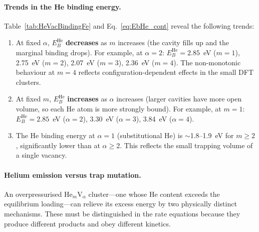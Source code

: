 \documentclass[pdflatex,sn-basic]{sn-jnl} %
\begin{document}
\paragraph{Trends in the He binding energy.}
Table~\ref{tab:HeVacBindingFe} and
Eq.~\eqref{eq:EbHe_cont} reveal the following trends:
\begin{enumerate}
    \item At fixed $\alpha$, $E_B^{\mathrm{He}}$ \textbf{decreases} as $m$
    increases (the cavity fills up and the marginal binding drops). For
    example, at $\alpha = 2$: $E_B^{\mathrm{He}} = 2.85$~eV ($m=1$),
    2.75~eV ($m=2$), 2.07~eV ($m=3$), 2.36~eV ($m=4$). The non-monotonic
    behaviour at $m=4$ reflects configuration-dependent effects in the small
    DFT clusters.
    
    \item At fixed $m$, $E_B^{\mathrm{He}}$ \textbf{increases} as $\alpha$
    increases (larger cavities have more open volume, so each He atom is more
    strongly bound). For example, at $m=1$: $E_B^{\mathrm{He}} = 2.85$~eV
    ($\alpha=2$), 3.30~eV ($\alpha=3$), 3.84~eV ($\alpha=4$).
    
    \item The He binding energy at $\alpha=1$ (substitutional He) is
    $\sim$1.8--1.9~eV for $m \geq 2$, significantly lower than at $\alpha
    \geq 2$. This reflects the small trapping volume of a single vacancy.
\end{enumerate}


\paragraph{Helium emission versus trap mutation.}

An overpressurised He$_m$V$_\alpha$ cluster---one whose He content exceeds the
equilibrium loading---can relieve its excess energy by two physically distinct
mechanisms. These must be distinguished in the rate equations because they
produce different products and obey different kinetics.
\end{document}
